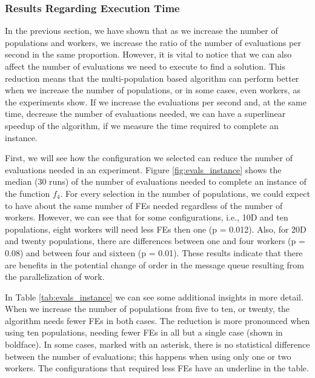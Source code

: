 \documentclass[review]{elsarticle}
\begin{document}



\subsubsection{Results Regarding Execution Time}
\label{sec:exec-time}

In the previous section, we have shown that as we increase the number of
populations and workers, we increase the ratio of the number of evaluations per
second in the same proportion. However, it is vital to notice that we can also
affect the number of evaluations we need to execute to find a solution. This
reduction means that the multi-population based algorithm can perform better
when we increase the number of populations, or in some cases, even workers, as the experiments
show. If we increase the evaluations per second and, at the same time, decrease
the number of evaluations needed, we can have a superlinear speedup of the
algorithm, if we measure the time required to complete an instance.  


First, we will see how the configuration we selected can reduce the number of
evaluations needed in an experiment. Figure \ref{fig:evals_instance} shows the
median (30 runs) of the number of evaluations needed to complete an instance of
the function $f_4$. For every selection in the number of populations, we could
expect to have about the same number of FEs needed regardless of the number of
workers. However, we can see that for some configurations, i.e., 10D and ten
populations, eight workers will need less FEs then one (p = 0.012). Also, for
20D and twenty populations, there are differences between one and four workers
(p = 0.08) and between four and sixteen (p = 0.01). These results indicate that
there are benefits in the potential change of order in the message queue
resulting from the parallelization of work.

In Table \ref{tab:evals_instance} we can see some additional insights in more
detail. When we increase the number of populations from five to ten, or twenty,
the algorithm needs fewer FEs in both cases. The reduction is more pronounced
when using ten populations, needing fewer FEs in all but a single case (shown in
boldface). In some cases, marked with an asterisk, there is no statistical
difference between the number of evaluations; this happens when using only one
or two workers. The configurations that required less FEs have an underline in
the table.
\end{document}
